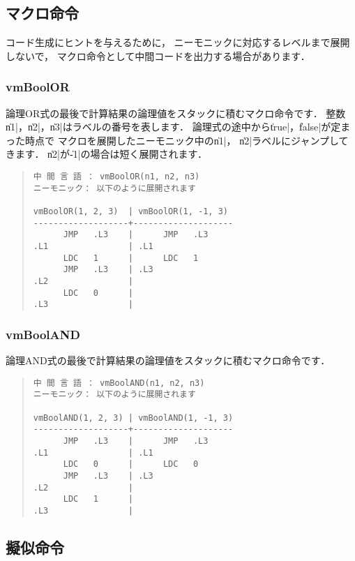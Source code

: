 \subsection{マクロ命令}

コード生成にヒントを与えるために，
ニーモニックに対応するレベルまで展開しないで，
マクロ命令として中間コードを出力する場合があります．

\subsubsection{vmBoolOR}

論理OR式の最後で計算結果の論理値をスタックに積むマクロ命令です．
整数\|n1|，\|n2|，\|n3|はラベルの番号を表します．
論理式の途中から\|true|，\|false|が定まった時点で
マクロを展開したニーモニック中の\|n1|，
\|n2|ラベルにジャンプしてきます．
\|n2|が\|-1|の場合は短く展開されます．

\begin{quote}
\begin{verbatim}
中 間 言 語 ： vmBoolOR(n1, n2, n3)
ニーモニック： 以下のように展開されます

vmBoolOR(1, 2, 3)  | vmBoolOR(1, -1, 3)
-------------------+--------------------
      JMP   .L3    |      JMP   .L3
.L1                | .L1
      LDC   1      |      LDC   1
      JMP   .L3    | .L3
.L2                |
      LDC   0      |
.L3                |
\end{verbatim}
\end{quote}

\subsubsection{vmBoolAND}

論理AND式の最後で計算結果の論理値をスタックに積むマクロ命令です．

\begin{quote}
\begin{verbatim}
中 間 言 語 ： vmBoolAND(n1, n2, n3)
ニーモニック： 以下のように展開されます

vmBoolAND(1, 2, 3) | vmBoolAND(1, -1, 3)
-------------------+--------------------
      JMP   .L3    |      JMP   .L3
.L1                | .L1
      LDC   0      |      LDC   0
      JMP   .L3    | .L3
.L2                |
      LDC   1      |
.L3                |
\end{verbatim}
\end{quote}

\subsection{擬似命令}

